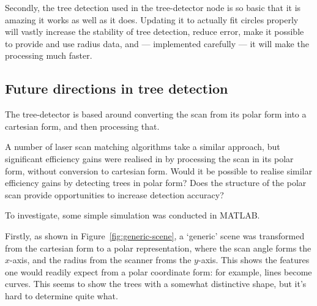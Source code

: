 \documentclass[12pt,oneside,a4paper]{book}
\begin{document}
Secondly, the tree detection used in the tree-detector node is so
basic that it is amazing it works as well as it does. Updating it to
actually fit circles properly will vastly increase the stability of
tree detection, reduce error, make it possible to provide and use
radius data, and --- implemented carefully --- it will make the
processing much faster.

\subsection{Future directions in tree detection}
\label{sec:future-direct-tree}

The tree-detector is based around converting the scan from its polar
form into a cartesian form, and then processing that.

A number of laser scan matching algorithms take a similar approach,
but significant efficiency gains were realised in
\cite{polarscanmatching} by processing the scan in its polar form,
without conversion to cartesian form. Would it be possible to realise
similar efficiency gains by detecting trees in polar form? Does the
structure of the polar scan provide opportunities to increase
detection accuracy?

To investigate, some simple simulation was conducted in MATLAB. 

Firstly, as shown in Figure~\ref{fig:generic-scene}, a `generic' scene
was transformed from the cartesian form to a polar representation,
where the scan angle forms the $x$-axis, and the radius from the
scanner froms the $y$-axis. This shows the features one would readily
expect from a polar coordinate form: for example, lines become
curves. This seems to show the trees with a somewhat distinctive
shape, but it's hard to determine quite what.
\end{document}
